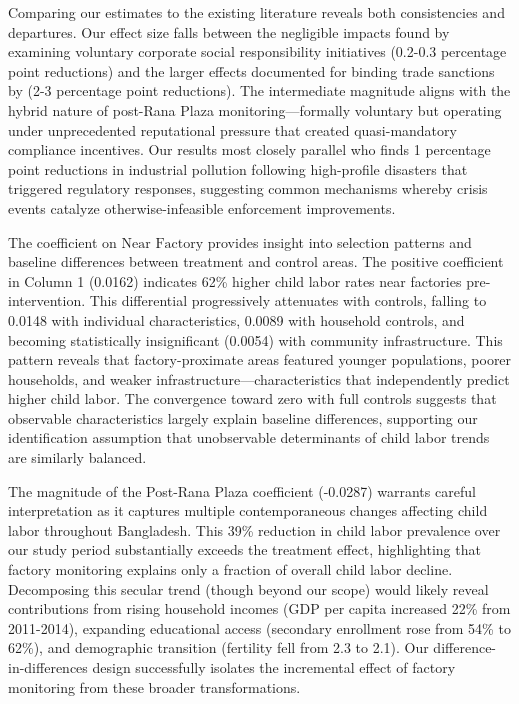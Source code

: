 \documentclass[12pt]{article}
\begin{document}
Comparing our estimates to the existing literature reveals both consistencies and departures. Our effect size falls between the negligible impacts found by \cite{locke2013promise} examining voluntary corporate social responsibility initiatives (0.2-0.3 percentage point reductions) and the larger effects documented for binding trade sanctions by \cite{edmonds2010trade} (2-3 percentage point reductions). The intermediate magnitude aligns with the hybrid nature of post-Rana Plaza monitoring—formally voluntary but operating under unprecedented reputational pressure that created quasi-mandatory compliance incentives. Our results most closely parallel \cite{tanaka2014environmental} who finds 1 percentage point reductions in industrial pollution following high-profile disasters that triggered regulatory responses, suggesting common mechanisms whereby crisis events catalyze otherwise-infeasible enforcement improvements.

The coefficient on $\text{Near Factory}$ provides insight into selection patterns and baseline differences between treatment and control areas. The positive coefficient in Column 1 (0.0162) indicates 62\% higher child labor rates near factories pre-intervention. This differential progressively attenuates with controls, falling to 0.0148 with individual characteristics, 0.0089 with household controls, and becoming statistically insignificant (0.0054) with community infrastructure. This pattern reveals that factory-proximate areas featured younger populations, poorer households, and weaker infrastructure—characteristics that independently predict higher child labor. The convergence toward zero with full controls suggests that observable characteristics largely explain baseline differences, supporting our identification assumption that unobservable determinants of child labor trends are similarly balanced.

The magnitude of the Post-Rana Plaza coefficient (-0.0287) warrants careful interpretation as it captures multiple contemporaneous changes affecting child labor throughout Bangladesh. This 39\% reduction in child labor prevalence over our study period substantially exceeds the treatment effect, highlighting that factory monitoring explains only a fraction of overall child labor decline. Decomposing this secular trend (though beyond our scope) would likely reveal contributions from rising household incomes (GDP per capita increased 22\% from 2011-2014), expanding educational access (secondary enrollment rose from 54\% to 62\%), and demographic transition (fertility fell from 2.3 to 2.1). Our difference-in-differences design successfully isolates the incremental effect of factory monitoring from these broader transformations.
\end{document}
